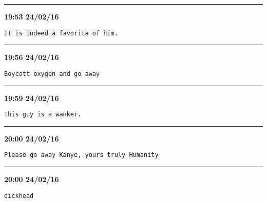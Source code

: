 \hrule%

\begin{adjustwidth}{0cm}{0cm}
\footnotesize \textbf{19:53 24/02/16}

\begin{lstlisting}[breaklines, breakatwhitespace, basicstyle=\small, frame=leftline]
It is indeed a favorita of him.
\end{lstlisting}
\end{adjustwidth}

\hrule%

\begin{adjustwidth}{0cm}{0cm}
\footnotesize \textbf{19:56 24/02/16}

\begin{lstlisting}[breaklines, breakatwhitespace, basicstyle=\small, frame=leftline]
Boycott oxygen and go away
\end{lstlisting}
\end{adjustwidth}

\hrule%

\begin{adjustwidth}{0cm}{0cm}
\footnotesize \textbf{19:59 24/02/16}

\begin{lstlisting}[breaklines, breakatwhitespace, basicstyle=\small, frame=leftline]
This guy is a wanker.
\end{lstlisting}
\end{adjustwidth}

\hrule%

\begin{adjustwidth}{0cm}{0cm}
\footnotesize \textbf{20:00 24/02/16}

\begin{lstlisting}[breaklines, breakatwhitespace, basicstyle=\small, frame=leftline]
Please go away Kanye, yours truly Humanity
\end{lstlisting}
\end{adjustwidth}

\hrule%

\begin{adjustwidth}{0cm}{0cm}
\footnotesize \textbf{20:00 24/02/16}

\begin{lstlisting}[breaklines, breakatwhitespace, basicstyle=\small, frame=leftline]
dickhead
\end{lstlisting}
\end{adjustwidth}

